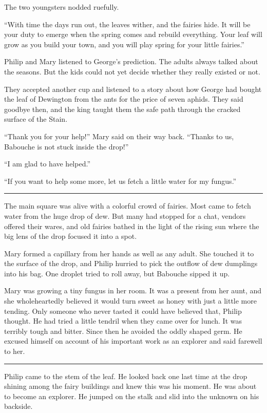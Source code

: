 \documentclass[10pt, draft]{memoir}
\renewcommand{\pfbreakdisplay}{\bigskip \ding{166} \bigskip}
\newcommand{\secbreak}{\fancybreak{\pfbreakdisplay}}
\begin{document}
The two youngsters nodded ruefully.

``With time the days run out, the leaves wither, and the fairies hide. It will
be your duty to emerge when the spring comes and rebuild everything. Your leaf
will grow as you build your town, and you will play spring for your little
fairies.''

Philip and Mary listened to George's prediction. The adults always talked about
the seasons. But the kids could not yet decide whether they really existed or
not.

They accepted another cup and listened to a story about how George had bought
the leaf of Dewington from the ants for the price of seven aphids. They said
goodbye then, and the king taught them the safe path through the cracked
surface of the Stain.

``Thank you for your help!'' Mary said on their way back. ``Thanks to us,
Babouche is not stuck inside the drop!''

``I am glad to have helped.''

``If you want to help some more, let us fetch a little water for my fungus.''

\secbreak

The main square was alive with a colorful crowd of fairies. Most came to fetch
water from the huge drop of dew. But many had stopped for a chat, vendors
offered their wares, and old fairies bathed in the light of the rising sun
where the big lens of the drop focused it into a spot.

Mary formed a capillary from her hands as well as any adult. She touched it to
the surface of the drop, and Philip hurried to pick the outflow of dew
dumplings into his bag. One droplet tried to roll away, but Babouche sipped it
up.

Mary was growing a tiny fungus in her room. It was a present from her aunt, and
she wholeheartedly believed it would turn sweet as honey with just a little
more tending. Only someone who never tasted it could have believed that, Philip
thought. He had tried a little tendril when they came over for lunch. It was
terribly tough and bitter. Since then he avoided the oddly shaped germ. He
excused himself on account of his important work as an explorer and said
farewell to her.

\secbreak

Philip came to the stem of the leaf. He looked back one last time at the drop
shining among the fairy buildings and knew this was his moment. He was about to
become an explorer. He jumped on the stalk and slid into the unknown on his
backside.
\end{document}
